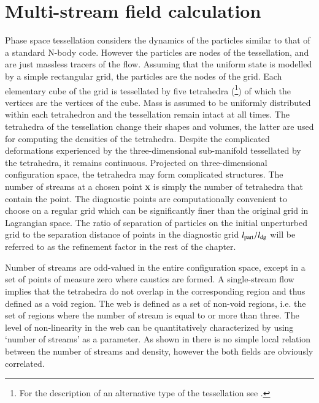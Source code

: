 \section{Multi-stream field calculation}
\label{subsec:method}

Phase space tessellation considers the dynamics of the particles similar to that of a standard N-body code. 
However the particles are nodes of the tessellation, and are just massless tracers of the flow.
Assuming that the uniform state is modelled by a simple rectangular grid, the particles are the nodes of the grid.
Each elementary cube of the grid is tessellated by five tetrahedra (\citealt{Shandarin2012}\footnote{For the description of an alternative type of the tessellation see \citet{Abel2012}.}) of which the vertices are the
vertices of the cube. Mass is assumed to be uniformly distributed within each tetrahedron and the tessellation remain
intact at all times. The tetrahedra of the tessellation change their shapes and volumes, the latter are used for
computing the densities of the tetrahedra. Despite the complicated deformations experienced by the three-dimensional
sub-manifold tessellated by the tetrahedra, it remains continuous. Projected on three-dimensional configuration space, the tetrahedra
may form complicated structures. The number of streams at a chosen point {\bf x} is simply the number of tetrahedra that contain the point. The diagnostic points are computationally convenient to choose on a regular grid which can be significantly finer than the original grid in Lagrangian space. The ratio of separation of particles on the initial unperturbed grid to the separation distance of points in the diagnostic grid  $l_{\rm part}/l_{\rm dg} $ will be referred to as the refinement factor in the rest of the chapter.

Number of streams are odd-valued in the entire configuration space, except in a set of points of measure zero where caustics are formed.  
 A single-stream flow implies that the tetrahedra do not overlap in the corresponding region and thus defined as a void region.
 The web is defined as a set of non-void regions, i.e. the set of regions where the number of stream is equal to or more than three.
 The level of non-linearity in the web  can be quantitatively characterized by using `number of streams' as a parameter. As shown in  \citep{Shandarin2012} there is no simple local relation between the number of streams and density, however the both
 fields are obviously correlated.

